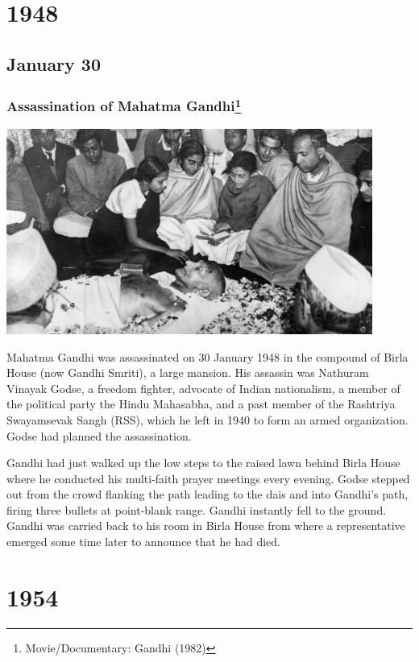 \documentclass[11pt]{report}
\begin{document}
\chapter{1948}
\section{January 30}
\subsection{Assassination of Mahatma Gandhi\protect\footnote{Movie/Documentary: Gandhi (1982)}}
\vspace{2mm}\begin{center}\includegraphics[width=12cm]{./img/gandhiDead.jpg}\end{center}
Mahatma Gandhi was assassinated on 30 January 1948 in the compound of Birla House (now Gandhi Smriti), a large mansion. His assassin was Nathuram Vinayak Godse, a freedom fighter, advocate of Indian nationalism, a member of the political party the Hindu Mahasabha, and a past member of the Rashtriya Swayamsevak Sangh (RSS), which he left in 1940 to form an armed organization. Godse had planned the assassination.

Gandhi had just walked up the low steps to the raised lawn behind Birla House where he conducted his multi-faith prayer meetings every evening. Godse stepped out from the crowd flanking the path leading to the dais and into Gandhi's path, firing three bullets at point-blank range. Gandhi instantly fell to the ground. Gandhi was carried back to his room in Birla House from where a representative emerged some time later to announce that he had died.

\chapter{1954}
\end{document}
